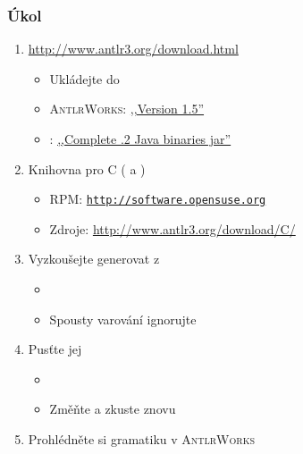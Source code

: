 \begin{frame}
  \frametitle{Úkol}

  \begin{enumerate}
    \item \url{http://www.antlr3.org/download.html}
    \begin{itemize}
      \item Ukládejte do 
      \item \textsc{AntlrWorks}: \href{http://www.antlr3.org/download/antlrworks-1.5.1.jar}{,,Version 1.5''}
      \item \ant: \href{http://www.antlr3.org/download/antlr-3.5.2-complete.jar}{,,Complete .2 Java binaries jar''}
    \end{itemize}

    \item Knihovna pro C ( a )
    \begin{itemize}
      \item RPM: \href{http://software.opensuse.org/package/libantlr3c2}{\nolinkurl{http://software.opensuse.org}}
      \item Zdroje: \url{http://www.antlr3.org/download/C/}
    \end{itemize}

    \item Vyzkoušejte generovat  z 
    \begin{itemize}
      \item {}
      \item Spousty varování ignorujte
    \end{itemize}

    \item Pusťte jej
    \begin{itemize}
      \item {}
      \item Změňte  a zkuste znovu
    \end{itemize}

  \item Prohlédněte si gramatiku v \textsc{AntlrWorks}
  \end{enumerate}

\end{frame}

